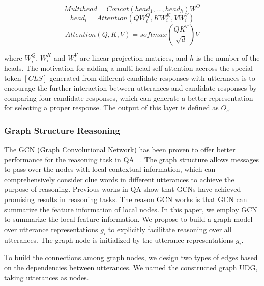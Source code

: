 \documentclass[letterpaper]{article}
\begin{document}
\begin{equation}
Multihead=Concat(head_1,...,head_h) W^O
\end{equation}
\begin{equation}
head_i=Attention(Q W_i^Q,KW_i^K,VW_i^V)
\end{equation}
\begin{equation}
Attention(Q,K,V)=softmax(\frac{QK^T}{\sqrt{d}}) V
\end{equation}

where $W_i^Q$, $W_i^K$ and $W_i^V$ are linear projection matrices, and $h$ is the number of the heads. The motivation for adding a multi-head self-attention accross the special token $[CLS]$ generated from different candidate responses with utterances is to encourage the further interaction between utterances and candidate responses by comparing four candidate responses, which can generate a better representation for selecting a proper response. The output of this layer is defined as $O_s$.

\subsubsection{Graph Structure Reasoning}
The GCN (Graph Convolutional Network) has been proven to offer better performance for the reasoning task in QA ~\cite{Martin,Fang2019,Qiu2020}. The graph structure allows messages to pass over the nodes with local contextual information, which can comprehensively consider clue words in different utterances to achieve the purpose of reasoning. Previous works in QA show that GCNs have achieved promising results in reasoning tasks. The reason GCN works is that GCN can summarize the feature information of local nodes. In this paper, we employ GCN to summarize the local feature information. We propose to build a graph model over utterance representations $g_i$ to explicitly facilitate reasoning over all utterances. The graph node is initialized by the utterance representations $g_i$.

To build the connections among graph nodes, we design two types of edges based on the dependencies between utterances. We named the constructed graph UDG, taking utterances as nodes.
\end{document}
